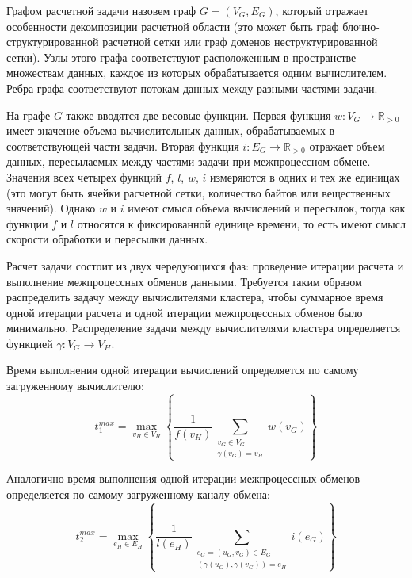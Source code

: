 \begin{definition}
Графом расчетной задачи назовем граф $G = (V_G, E_G)$, который отражает особенности декомпозиции расчетной области (это может быть граф блочно-структурированной расчетной сетки или граф доменов неструктурированной сетки).
Узлы этого графа соответствуют расположенным в пространстве множествам данных, каждое из которых обрабатывается одним вычислителем.
Ребра графа соответствуют потокам данных между разными частями задачи.
\end{definition}

На графе $G$ также вводятся две весовые функции.
Первая функция $w: V_G \rightarrow \mathbb{R}_{> 0}$ имеет значение объема вычислительных данных, обрабатываемых в соответствующей части задачи.
Вторая функция $i: E_G \rightarrow \mathbb{R}_{> 0}$ отражает объем данных, пересылаемых между частями задачи при межпроцессном обмене.
Значения всех четырех функций $f$, $l$, $w$, $i$ измеряются в одних и тех же единицах (это могут быть ячейки расчетной сетки, количество байтов или вещественных значений).
Однако $w$ и $i$ имеют смысл объема вычислений и пересылок, тогда как функции $f$ и $l$ относятся к фиксированной единице времени, то есть имеют смысл скорости обработки и пересылки данных.

Расчет задачи состоит из двух чередующихся фаз: проведение итерации расчета и выполнение межпроцессных обменов данными.
Требуется таким образом распределить задачу между вычислителями кластера, чтобы суммарное время одной итерации расчета и одной итерации межпроцессных обменов было минимально.
Распределение задачи между вычислителями кластера определяется функцией $\gamma: V_G \rightarrow V_H$.

Время выполнения одной итерации вычислений определяется по самому загруженному вычислителю:
\begin{equation}
	t_1^{max} = \max_{v_H \in V_H}{ \left\{ \frac{1}{f(v_H)} \sum_{\substack{v_G \in V_G \\ \gamma(v_G) = v_H}}{w(v_G)} \right\} }
\end{equation}

Аналогично время выполнения одной итерации межпроцессных обменов определяется по самому загруженному каналу обмена:
\begin{equation}
	t_2^{max} = \max_{e_H \in E_H}{ \left\{ \frac{1}{l(e_H)} \sum_{\substack{e_G = (u_G, v_G) \in E_G \\ (\gamma(u_G), \gamma(v_G)) = e_H}}{i(e_G)} \right\} }
\end{equation}


